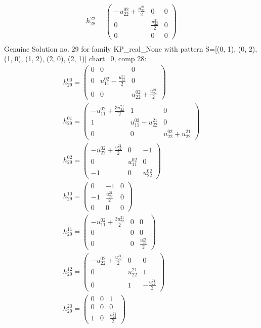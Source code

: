 \documentclass[a4paper, 11pt, twoside, onecolumn]{article}
\begin{document}
\begin{landscape}
\begin{gather*}
	 h_{28}^{22}=\begin{pmatrix}- u^{02}_{22} + \frac{u^{21}_{22}}{2} & 0 & 0\\0 & \frac{u^{21}_{22}}{2} & 0\\0 & 0 & 0\end{pmatrix}\\ 
\end{gather*} 
Genuine Solution no. 29 for family KP_real_None with pattern S=[(0, 1), (0, 2), (1, 0), (1, 2), (2, 0), (2, 1)] chart=0, comp 28: 
\begin{gather*} 
	 h_{29}^{00}=\begin{pmatrix}0 & 0 & 0\\0 & u^{02}_{11} - \frac{u^{21}_{22}}{2} & 0\\0 & 0 & u^{02}_{22} + \frac{u^{21}_{22}}{2}\end{pmatrix}\\ 
	 h_{29}^{01}=\begin{pmatrix}- u^{02}_{11} + \frac{3 u^{21}_{22}}{2} & 1 & 0\\1 & u^{02}_{11} - u^{21}_{22} & 0\\0 & 0 & u^{02}_{22} + u^{21}_{22}\end{pmatrix}\\ 
	 h_{29}^{02}=\begin{pmatrix}- u^{02}_{22} + \frac{u^{21}_{22}}{2} & 0 & -1\\0 & u^{02}_{11} & 0\\-1 & 0 & u^{02}_{22}\end{pmatrix}\\ 
	 h_{29}^{10}=\begin{pmatrix}0 & -1 & 0\\-1 & \frac{u^{21}_{22}}{2} & 0\\0 & 0 & 0\end{pmatrix}\\ 
	 h_{29}^{11}=\begin{pmatrix}- u^{02}_{11} + \frac{3 u^{21}_{22}}{2} & 0 & 0\\0 & 0 & 0\\0 & 0 & \frac{u^{21}_{22}}{2}\end{pmatrix}\\ 
	 h_{29}^{12}=\begin{pmatrix}- u^{02}_{22} + \frac{u^{21}_{22}}{2} & 0 & 0\\0 & u^{21}_{22} & 1\\0 & 1 & - \frac{u^{21}_{22}}{2}\end{pmatrix}\\ 
	 h_{29}^{20}=\begin{pmatrix}0 & 0 & 1\\0 & 0 & 0\\1 & 0 & \frac{u^{21}_{22}}{2}\end{pmatrix}\\ 

\end{gather*}
\end{landscape}
\end{document}
